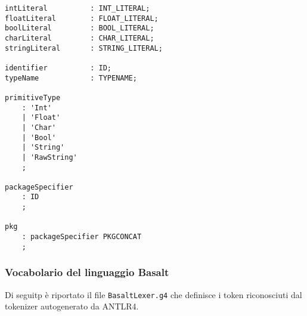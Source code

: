 \begin{lstlisting}[frame=single]
intLiteral          : INT_LITERAL;
floatLiteral        : FLOAT_LITERAL;
boolLiteral         : BOOL_LITERAL;
charLiteral         : CHAR_LITERAL;
stringLiteral       : STRING_LITERAL;

identifier          : ID;
typeName            : TYPENAME;

primitiveType       
    : 'Int'
    | 'Float'
    | 'Char'
    | 'Bool'
    | 'String'
    | 'RawString'
    ;

packageSpecifier
    : ID
    ;

pkg 
    : packageSpecifier PKGCONCAT
    ;

\end{lstlisting}

\newpage

\subsubsection{Vocabolario del linguaggio Basalt}
Di seguitp è riportato il file \texttt{BasaltLexer.g4} che definisce i 
token riconosciuti dal tokenizer autogenerato da ANTLR4. \\

